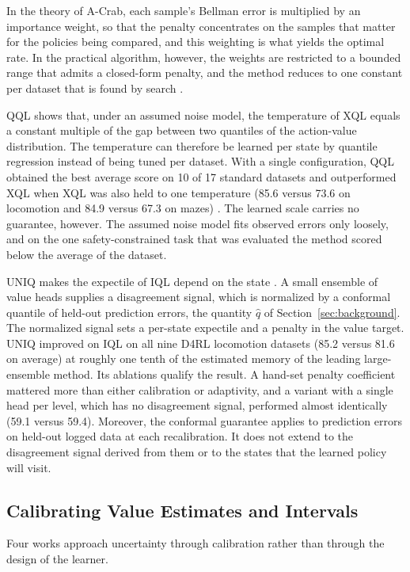 \documentclass[conference]{IEEEtran}
\begin{document}
In the theory of A-Crab, each sample's Bellman error is multiplied by an importance weight, so that the penalty concentrates on the samples that matter for the policies being compared, and this weighting is what yields the optimal rate. In the practical algorithm, however, the weights are restricted to a bounded range that admits a closed-form penalty, and the method reduces to one constant per dataset that is found by search \cite{zhu2023acrab}.

QQL shows that, under an assumed noise model, the temperature of XQL equals a constant multiple of the gap between two quantiles of the action-value distribution. The temperature can therefore be learned per state by quantile regression instead of being tuned per dataset. With a single configuration, QQL obtained the best average score on 10 of 17 standard datasets and outperformed XQL when XQL was also held to one temperature (85.6 versus 73.6 on locomotion and 84.9 versus 67.3 on mazes) \cite{gao2026qql}. The learned scale carries no guarantee, however. The assumed noise model fits observed errors only loosely, and on the one safety-constrained task that was evaluated the method scored below the average of the dataset.

UNIQ makes the expectile of IQL depend on the state \cite{upadhyay2026uniq}. A small ensemble of value heads supplies a disagreement signal, which is normalized by a conformal quantile of held-out prediction errors, the quantity $\hat{q}$ of Section~\ref{sec:background}. The normalized signal sets a per-state expectile and a penalty in the value target. UNIQ improved on IQL on all nine D4RL locomotion datasets (85.2 versus 81.6 on average) at roughly one tenth of the estimated memory of the leading large-ensemble method. Its ablations qualify the result. A hand-set penalty coefficient mattered more than either calibration or adaptivity, and a variant with a single head per level, which has no disagreement signal, performed almost identically (59.1 versus 59.4). Moreover, the conformal guarantee applies to prediction errors on held-out logged data at each recalibration. It does not extend to the disagreement signal derived from them or to the states that the learned policy will visit.

\subsection{Calibrating Value Estimates and Intervals}
Four works approach uncertainty through calibration rather than through the design of the learner.
\end{document}
